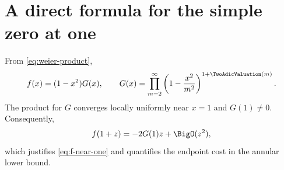 \documentclass[11pt,oneside]{article}
\theoremstyle{definition}
\theoremstyle{remark}
\begin{document}
\section{A direct formula for the simple zero at one}

From \eqref{eq:weier-product},
\begin{equation}
 f(x)=(1-x^2)G(x),
 \qquad
 G(x)=\prod_{m=2}^{\infty}
 \left(1-\frac{x^2}{m^2}\right)^{1+\TwoAdicValuation(m)}.              \label{eq:G-near-one}
\end{equation}
The product for $G$ converges locally uniformly near $x=1$ and $G(1)\ne0$.
Consequently,
\begin{equation}
 f(1+z)=-2G(1)z+\BigO(z^2),                                \label{eq:simple-zero}
\end{equation}
which justifies \eqref{eq:f-near-one} and quantifies the endpoint cost in the
annular lower bound.
\end{document}
